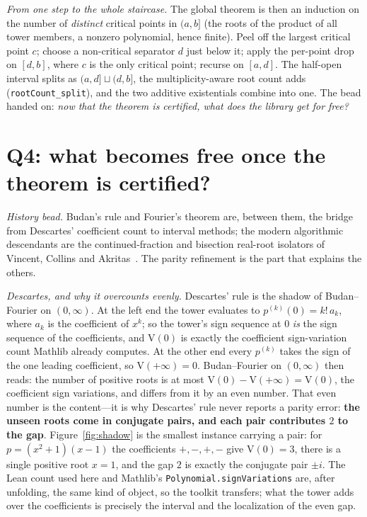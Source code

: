 \documentclass[11pt]{article}
\newcommand{\lean}[1]{\texttt{#1}}
\newcommand{\V}{\mathrm{V}}
\begin{document}
\emph{From one step to the whole staircase.} The global theorem is then an induction on the number of
\emph{distinct} critical points in $(a,b]$ (the roots of the product of all tower members, a nonzero
polynomial, hence finite). Peel off the largest critical point $c$; choose a non-critical separator
$d$ just below it; apply the per-point drop on $[d,b]$, where $c$ is the only critical point; recurse
on $[a,d]$. The half-open interval splits as $(a,d]\sqcup(d,b]$, the multiplicity-aware root count
adds (\lean{rootCount\_split}), and the two additive existentials combine into one. The bead handed on:
\emph{now that the theorem is certified, what does the library get for free?}

\section{Q4: what becomes free once the theorem is certified?}\label{sec:q4}

\emph{History bead.} Budan's rule and Fourier's theorem are, between them, the bridge from Descartes'
coefficient count to interval methods; the modern algorithmic descendants are the continued-fraction
and bisection real-root isolators of Vincent, Collins and Akritas~\cite{vincent,collinsakritas}. The
parity refinement is the part that explains the others.

\emph{Descartes, and why it overcounts evenly.} Descartes' rule is the shadow of Budan--Fourier on
$(0,\infty)$. At the left end the tower evaluates to $p^{(k)}(0)=k!\,a_k$, where $a_k$ is the
coefficient of $x^k$; so the tower's sign sequence at $0$ \emph{is} the sign sequence of the
coefficients, and $\V(0)$ is exactly the coefficient sign-variation count Mathlib already computes. At
the other end every $p^{(k)}$ takes the sign of the one leading coefficient, so $\V(+\infty)=0$.
Budan--Fourier on $(0,\infty)$ then reads: the number of positive roots is at most
$\V(0)-\V(+\infty)=\V(0)$, the coefficient sign variations, and differs from it by an even number. That
even number is the content---it is why Descartes' rule never reports a parity error:
\textbf{the unseen roots come in conjugate pairs, and each pair contributes $2$ to the gap}.
Figure~\ref{fig:shadow} is the smallest instance carrying a pair: for $p=(x^2+1)(x-1)$ the
coefficients $+,-,+,-$ give $\V(0)=3$, there is a single positive root $x=1$, and the gap $2$ is
exactly the conjugate pair $\pm i$. The Lean count used here and Mathlib's
\lean{Polynomial.signVariations} are, after unfolding, the same kind of object, so the toolkit
transfers; what the tower adds over the coefficients is precisely the interval and the localization of
the even gap.
\end{document}
